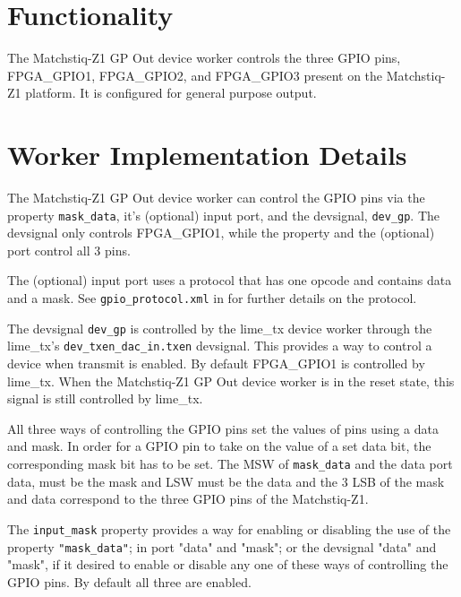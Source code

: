 \def\name{\comp}
\def\workertype{}
\def\version{\ocpiversion}
\def\releasedate{5/2020}
\def\componentlibrary{ocpi.assets.platforms.matchstiq\_{}z1.devices}
\def\workers{matchstiq\_{}z1\_{}gp\_{}out.hdl}
\def\testedplatforms{matchstiq\_{}z1, xsim}


\section*{Functionality}
\begin{flushleft}
The Matchstiq-Z1 GP Out device worker controls the three GPIO pins, FPGA\_GPIO1, FPGA\_GPIO2, and FPGA\_GPIO3 present on the Matchstiq-Z1 platform. It is configured for general purpose output.

\end{flushleft}

\section*{Worker Implementation Details}
\begin{flushleft}

The Matchstiq-Z1 GP Out device worker can control the GPIO pins via the property \texttt{mask\_data}, it's (optional) input port, and the devsignal, \texttt{dev\_gp}. The devsignal only controls FPGA\_GPIO1, while the property and the (optional) port control all 3 pins. \newline

The (optional) input port uses a protocol that has one opcode and contains data and a mask. See \texttt{gpio\_protocol.xml} in   for further details on the protocol. \newline

The devsignal \texttt{dev\_gp} is controlled by the lime\_tx device worker through the lime\_tx's \texttt{dev\_txen\_dac\_in.txen} devsignal. This provides a way to control a device when transmit is enabled. By default FPGA\_GPIO1 is controlled by lime\_tx. When the Matchstiq-Z1 GP Out device worker is in the reset state, this signal is still controlled by lime\_tx. \newline

All three ways of controlling the GPIO pins set the values of pins using a data and mask. In order for a GPIO pin to take on the value of a set data bit, the corresponding mask bit has to be set. The MSW of \texttt{mask\_data} and the data port data, must be the mask and LSW must be the data and the 3 LSB of the mask and data correspond to the three GPIO pins of the Matchstiq-Z1. \newline

The \texttt{input\_mask} property provides a way for enabling or disabling the use of the property \texttt{"mask\_data"}; in port "data" and "mask"; or the devsignal "data" and "mask", if it desired to enable or disable any one of these ways of controlling the GPIO pins. By default all three are enabled.

\end{flushleft}


